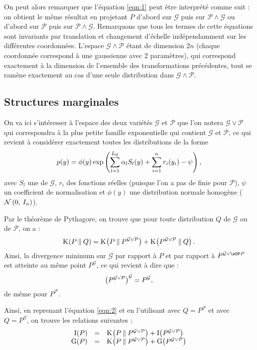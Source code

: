 \documentclass[a4paper]{article}
\newcommand{\Kl}[3][]{\mathrm K_{#1}\!\zp{#2\:\|\:#3}}
\newcommand{\zZ}[2]{\mathrm #1\!\zp{#2}}
\newcommand{\zD}{\mathcal}
\newcommand{\Ng}[2]{\mathcal{N}\zp{#1,\:#2}}
\begin{document}
On peut alors remarquer que l'équation \ref{eqn:1} peut être interprété comme suit : on obtient le même résultat en projetant $P$ d'abord sur $\zD G$ puis sur $\zD P\wedge\zD G$ ou d'abord sur $\zD P$ puis sur $\zD P\wedge\zD G$.
Remarquons que tous les termes de cette équations sont invariants par translation et changement d'échelle indépendamment sur les différentes coordonnées. L'espace $\zD G\wedge\zD P$ étant de dimension $2n$ (chaque coordonnée correspond à une gaussienne avec $2$ paramètres), qui correspond exactement à la dimension de l'ensemble des transformations précédentes, tout se ramène exactement au cas d'une seule distribution dans $\zD G\wedge\zD P$.

\subsection{Structures marginales}

On va ici s'intéresser à l'espace  des deux variétés $\zD G$ et $\zD P$ que l'on notera $\zD G\vee\zD P$ qui correspondra à la plus petite famille exponentielle qui contient $\zD G$ et $\zD P$, ce qui revient à considérer exactement toutes les distributions de la forme \begin{equation}\label{eqn:3}
p(y) = \phi(y)\exp\zp{\sum_{l=1}^{L_{\zD G}}\alpha_l S_l(y) + \sum_{i=1}^{n}r_i(y_i) - \psi},
\end{equation}
avec $S_l$ une  de $\zD G$, $r_i$ des fonctions réelles (puisque l'on a pas de  finie pour $\zD P$), $\psi$ un coefficient de normalisation et $\phi(y)$ une distribution normale homogène ($\Ng{0}{I_n}$).

Par le théorème de Pythagore, on trouve que pour toute distribution $Q$ de $\zD G$ ou de $\zD P$, on a :\begin{equation}\label{eqn:2}
\Kl PQ = \Kl P{P^{\zD G\vee\zD P}} + \Kl {P^{\zD G\vee\zD P}}Q.
\end{equation}
Ainsi, la divergence minimum sur $\zD G$ par rapport à $P$ et par rapport à $P^{\zD G\vee\zDP P}$ est atteinte au même point $P^{\zD G}$, ce qui revient à dire que :\[
\zp{P^{\zD G\vee \zD P}}^{\zD G} = P^{\zD G},
\]
de même pour $P^{\zD P}$.

Ainsi, en reprenant l'équation \ref{eqn:2} et en l'utilisant avec $Q=P^{\zD P}$ et avec $Q=P^{\zD G}$, on trouve les relations suivantes : \[\begin{array}{rcl}
\zZ IP &=& \Kl P{P^{\zD G\vee\zD P}} + \zZ I{P^{\zD G\vee\zD P}}\\
\zZ GP &=& \Kl P{P^{\zD G\vee\zD P}} + \zZ G{P^{\zD G\vee\zD P}}\\
\end{array}\]
\end{document}
